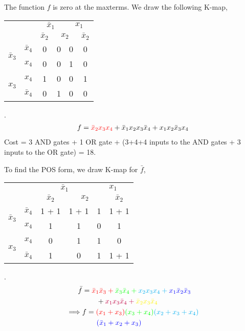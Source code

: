\documentclass[twocolumn]{article}
\newcommand{\bx}{\bar{x}}
\newcommand{\cred}{\color{red}}
\newcommand{\cg}{\color{green}}
\newcommand{\cb}{\color{blue}}
\begin{document}
The function $f$ is zero at the maxterms. We draw the following K-map,
\\
\begin{tabular}{c|c|c|c|c|c}
  \toprule
  && \multicolumn{2}{c|}{$\bx_1$} & \multicolumn{2}{c}{$x_1$}
  \\
  && $\bx_2$ & \multicolumn{2}{c|}{$x_2$} & $\bx_2$
  \\ \midrule
  \multirow{2}{*}{$\bx_3$} & $\bx_4$
                                  & 0 & 0 & 0 & 0
  \\
  & $x_4$
                                  & 0 & 0 & 1 & 0
  \\
  \multirow{2}{*}{$x_3$}   &  $x_4$
                                  & \cred 1 & 0 & 0 & \cred 1
  \\
  & $\bx_4$
                                  & 0 & 1 & 0 & 0
  \\\bottomrule
\end{tabular}.
\\
\begin{align}
  f = {\cred \bx_2 x_3 x_4} + \bx_1 x_2  x_3 \bx_4 + x_1 x_2 \bx_3 x_4
\end{align}
Cost = 3 AND gates + 1 OR gate + (3+4+4 inputs to the AND gates + 3 inputs to the OR
gate) = 18.

To find the POS form, we draw K-map for $\bar{f}$,
\\
\begin{tabular}{c|c|c|c|c|c}
  \toprule
  && \multicolumn{2}{c|}{$\bx_1$} & \multicolumn{2}{c}{$x_1$}
  \\
  && $\bx_2$ & \multicolumn{2}{c|}{$x_2$} & $\bx_2$
  \\ \midrule
  \multirow{2}{*}{$\bx_3$} & $\bx_4$
                                  & \cred 1 + \cg 1 & \cred 1 + \cg 1 & \cg 1 & \cg 1 + \cb 1
  \\
  & $x_4$
                                  & \cred 1 & \cred 1 & 0 & \cb 1
  \\
  \multirow{2}{*}{$x_3$}   &  $x_4$
                                  & 0 & \color{cyan} 1 & \color{cyan} 1 & 0
  \\
  & $\bx_4$
                                  & \color{yellow} 1 & 0 & \color{purple} 1 & \color{purple} 1 + \color{yellow} 1
  \\\bottomrule
\end{tabular}.
\\
\begin{align*}
  \bar{f} &= \cred \bx_1 \bx_3 + \cg \bx_3 \bx_4 + \color{cyan} x_2 x_3 x_4 + \cb x_1
  \bx_2 \bx_3 \\
  &\qquad + \color{purple} x_1 x_3 \bx_4 + \color{yellow} \bx_2 x_3 \bx_4
  \\
  \implies &f = {\cred (x_1 + x_3)}{\cg (x_3 + x_4)}{\color{cyan} (x_2 + x_3 + x_4)}
  \\
             &\qquad {\cb (\bx_1 + x_2 + x_3)}
\end{align*}
\end{document}
